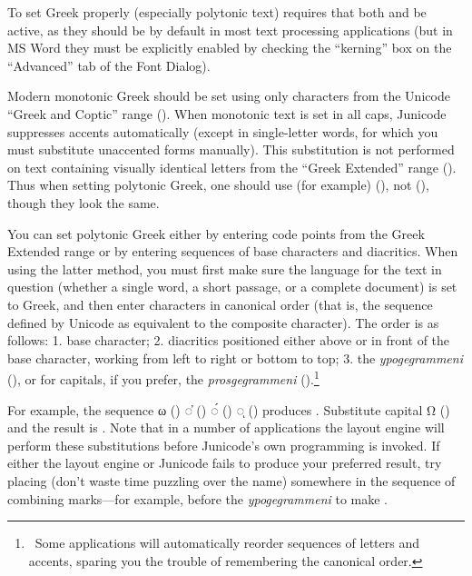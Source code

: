 To set Greek properly (especially polytonic text) requires that both 
and  be active, as they should be by default in most
text processing applications (but in MS Word they must be explicitly enabled
by checking the “kerning” box on the “Advanced” tab of the Font Dialog).

Modern monotonic Greek should be set using only characters from the Unicode “Greek
and Coptic” range (). When monotonic text is set in all caps, Junicode
suppresses accents automatically (except in single-letter words, for which
you must substitute unaccented forms manually). This substitution is not
performed on text containing visually identical letters from the “Greek Extended”
range ().
Thus when setting polytonic Greek, one should use (for example) 
(), not  (),
though they look the same.

You can set polytonic Greek either by entering code points from the Greek
Extended range or by entering sequences of base characters and diacritics.
When using the latter method, you must first make sure the language for the
text in question (whether a single word, a short passage, or a complete
document) is set to Greek, and then enter characters in canonical order
(that is, the sequence defined by Unicode as equivalent to the composite
character). The order is as follows: 1. base character; 2. diacritics
positioned either above or in front of the base character, working from left
to right or bottom to top; 3. the \textit{ypogegrammeni} (), or for
capitals, if you prefer, the \textit{prosgegrammeni} ().\footnote{\ Some
applications will automatically reorder sequences of letters and accents,
sparing you the trouble of remembering the canonical order.}

For example, the sequence ω () ◌̓ () ◌́ () ◌ͅ ()
produces .
Substitute capital Ω () and the result is
. Note that in a number of applications the layout
engine will perform these substitutions before Junicode’s own programming is
invoked. If either the layout engine or Junicode fails to produce your
preferred result, try placing  
(don't waste time puzzling over the name) somewhere
in the sequence of combining marks—for example, before the \textit{ypogegrammeni}
to make .

